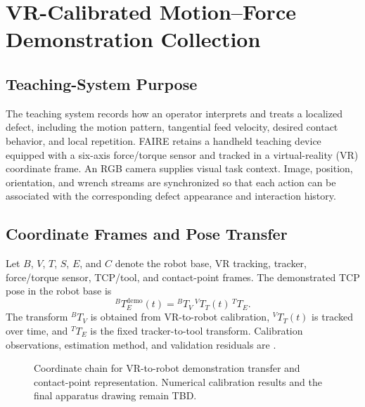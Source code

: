 \chapter{VR-Calibrated Motion--Force Demonstration Collection}
\label{chap:demonstration_collection}

\section{Teaching-System Purpose}
The teaching system records how an operator interprets and treats a localized defect, including the motion pattern, tangential feed velocity, desired contact behavior, and local repetition. FAIRE retains a handheld teaching device equipped with a six-axis force/torque sensor and tracked in a virtual-reality (VR) coordinate frame. An RGB camera supplies visual task context. Image, position, orientation, and wrench streams are synchronized so that each action can be associated with the corresponding defect appearance and interaction history.

\section{Coordinate Frames and Pose Transfer}
Let \(B\), \(V\), \(T\), \(S\), \(E\), and \(C\) denote the robot base, VR tracking, tracker, force/torque sensor, TCP/tool, and contact-point frames. The demonstrated TCP pose in the robot base is
\begin{equation}
  {}^{B}\!T_{E}^{\mathrm{demo}}(t)
  =
  {}^{B}\!T_{V}\,
  {}^{V}\!T_{T}(t)\,
  {}^{T}\!T_{E}.
  \label{eq:demo_transfer}
\end{equation}
The transform \({}^{B}\!T_V\) is obtained from VR-to-robot calibration, \({}^{V}\!T_T(t)\) is tracked over time, and \({}^{T}\!T_E\) is the fixed tracker-to-tool transform. Calibration observations, estimation method, and validation residuals are .

\begin{figure}[t]
  \centering
  \caption{Coordinate chain for VR-to-robot demonstration transfer and contact-point representation. Numerical calibration results and the final apparatus drawing remain TBD.}
  \label{fig:demo_transfer}
\end{figure}

